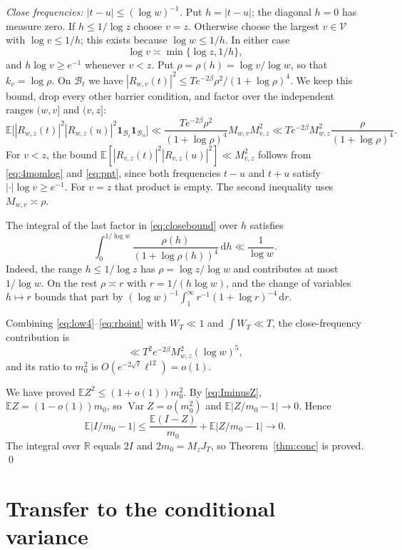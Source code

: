 \documentclass[11pt]{amsart}
\theoremstyle{remark}
\numberwithin{equation}{section}
\newcommand{\E}{\mathbb{E}}
\newcommand{\R}{\mathbb{R}}
\newcommand{\one}{\mathbf{1}}
\newcommand{\Var}{\operatorname{Var}}
\newcommand{\dd}{\,\mathrm{d}}
\begin{document}
\medskip\noindent\emph{Close frequencies: $|t-u|\le(\log w)^{-1}$.} Put $h=|t-u|$; the diagonal $h=0$ has measure zero. If $h\le1/\log z$ choose $v=z$. Otherwise choose the largest $v\in\mathcal V$ with $\log v\le1/h$; this exists because $\log w\le1/h$. In either case
\[
\log v\asymp\min\{\log z,1/h\},
\]
and $h\log v\ge e^{-1}$ whenever $v<z$. Put $\rho=\rho(h)=\log v/\log w$, so that $k_v=\log\rho$. On $\mathcal B_t$ we have $|R_{w,v}(t)|^2\le Te^{-2\beta}\rho^2/(1+\log\rho)^4$. We keep this bound, drop every other barrier condition, and factor over the independent ranges $(w,v]$ and $(v,z]$:
\begin{equation}\label{eq:closebound}
\E\bigl[|R_{w,z}(t)|^2|R_{w,z}(u)|^2\one_{\mathcal B_t}\one_{\mathcal B_u}\bigr]\ll\frac{Te^{-2\beta}\rho^2}{(1+\log\rho)^4}M_{w,v}M_{v,z}^2\ll Te^{-2\beta}M_{w,z}^2\frac{\rho}{(1+\log\rho)^4}.
\end{equation}
For $v<z$, the bound $\E[|R_{v,z}(t)|^2|R_{v,z}(u)|^2]\ll M_{v,z}^2$ follows from \eqref{eq:4momlog} and \eqref{eq:pnt}, since both frequencies $t-u$ and $t+u$ satisfy $|\cdot|\log v\ge e^{-1}$. For $v=z$ that product is empty. The second inequality uses $M_{w,v}\asymp\rho$.

The integral of the last factor in \eqref{eq:closebound} over $h$ satisfies
\begin{equation}\label{eq:rhoint}
\int_0^{1/\log w}\frac{\rho(h)}{(1+\log\rho(h))^4}\dd h\ll\frac{1}{\log w}.
\end{equation}
Indeed, the range $h\le1/\log z$ has $\rho=\log z/\log w$ and contributes at most $1/\log w$. On the rest $\rho\asymp r$ with $r=1/(h\log w)$, and the change of variables $h\mapsto r$ bounds that part by $(\log w)^{-1}\int_1^\infty r^{-1}(1+\log r)^{-4}\dd r$.

Combining \eqref{eq:low4}--\eqref{eq:rhoint} with $W_T\ll1$ and $\int W_T\ll T$, the close-frequency contribution is
\[
\ll T^2e^{-2\beta}M_{w,z}^2(\log w)^5 ,
\]
and its ratio to $m_0^2$ is $O(e^{-2\sqrt\ell}\ell^{12})=o(1)$.

\medskip
We have proved $\E Z^2\le(1+o(1))m_0^2$. By \eqref{eq:IminusZ}, $\E Z=(1-o(1))m_0$, so $\Var Z=o(m_0^2)$ and $\E|Z/m_0-1|\to0$. Hence
\[
\E\bigl|I/m_0-1\bigr|\le\frac{\E(I-Z)}{m_0}+\E\bigl|Z/m_0-1\bigr|\longrightarrow0 .
\]
The integral over $\R$ equals $2I$ and $2m_0=M_zJ_T$, so Theorem~\ref{thm:conc} is proved. \qed

\section{Transfer to the conditional variance}\label{sec:transfer}
\end{document}
